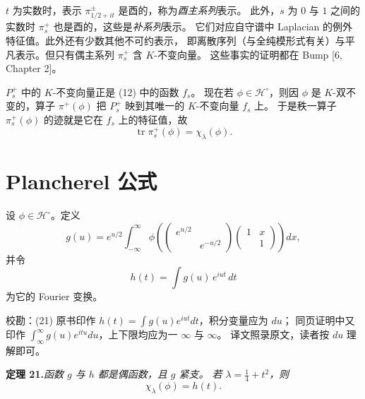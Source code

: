 $t$ 为实数时，表示 $\pi_{1/2+it}^{\pm}$ 是酉的，称为\emph{酉主系列}表示。
此外，$s$ 为 $0$ 与 $1$ 之间的实数时 $\pi_{s}^{+}$ 也是酉的，这些是\emph{补系列}表示。
它们对应自守谱中 Laplacian 的例外特征值。此外还有少数其他不可约表示，
即离散序列（与全纯模形式有关）与平凡表示。但只有偶主系列 $\pi_{s}^{+}$ 含 $K$-不变向量。
这些事实的证明都在 Bump [6, Chapter 2]。

$P_{s}^{+}$ 中的 $K$-不变向量正是 (12) 中的函数 $f_{s}$。
现在若 $\phi\in\mathcal{H}^{\circ}$，则因 $\phi$ 是 $K$-双不变的，算子 $\pi^{+}(\phi)$
把 $P_{s}^{+}$ 映到其唯一的 $K$-不变向量 $f_{s}$ 上。
于是秩一算子 $\pi_{s}^{+}(\phi)$ 的迹就是它在 $f_{s}$ 上的特征值，故
\begin{equation}\tag{19}
\operatorname{tr}\pi_{s}^{+}(\phi)=\chi_{\lambda}(\phi).
\end{equation}
\section{Plancherel 公式}

设 $\phi\in\mathcal{H}^{\circ}$。定义
\begin{equation}\tag{20}
g(u)=e^{u/2}\int_{-\infty}^{\infty}
\phi\!\left(\begin{pmatrix}e^{u/2}&\\&e^{-u/2}\end{pmatrix}
\begin{pmatrix}1&x\\&1\end{pmatrix}\right)dx,
\end{equation}
并令
\begin{equation}\tag{21}
h(t)=\int g(u)\,e^{iut}\,dt
\end{equation}
为它的 Fourier 变换。

\begin{annote}
校勘：(21) 原书印作 $h(t)=\int g(u)e^{iut}dt$，积分变量应为 $du$；
同页证明中又印作 $\int_{\infty}^{\infty}g(u)e^{itu}du$，上下限均应为一 $\infty$ 与 $\infty$。
译文照录原文，读者按 $du$ 理解即可。
\par\vspace{0.15em}{\raggedleft 【来源：原书 p.~169，式 (21) 及其证明（A）】\par}
\end{annote}


\par\medskip\noindent\textbf{定理 21.}\quad\emph{函数 $g$ 与 $h$ 都是偶函数，且 $g$ 紧支。
若 $\lambda=\tfrac14+t^{2}$，则}
\begin{equation}\tag{22}
\chi_{\lambda}(\phi)=h(t).
\end{equation}

